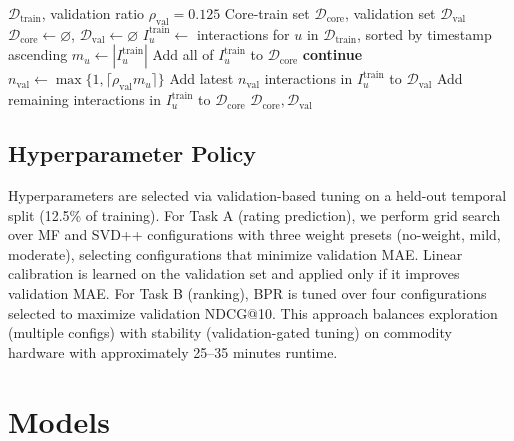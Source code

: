 \documentclass[sigconf,nonacm]{acmart}
\begin{document}
\begin{algorithm}[t]
\caption{Per-User Validation Split Within Train}
\label{alg:val-split}
\begin{algorithmic}[1]
\Require $\mathcal{D}_{\mathrm{train}}$, validation ratio $\rho_{\mathrm{val}} = 0.125$
\Ensure Core-train set $\mathcal{D}_{\mathrm{core}}$, validation set $\mathcal{D}_{\mathrm{val}}$
\State $\mathcal{D}_{\mathrm{core}} \gets \varnothing$, $\mathcal{D}_{\mathrm{val}} \gets \varnothing$
  \State $I^{\mathrm{train}}_u \gets$ interactions for $u$ in $\mathcal{D}_{\mathrm{train}}$, sorted by timestamp ascending
  \State $m_u \gets |I^{\mathrm{train}}_u|$
    \State Add all of $I^{\mathrm{train}}_u$ to $\mathcal{D}_{\mathrm{core}}$
    \State \textbf{continue}
  \EndIf
  \State $n_{\mathrm{val}} \gets \max\{1, \lceil \rho_{\mathrm{val}} m_u \rceil\}$
  \State Add latest $n_{\mathrm{val}}$ interactions in $I^{\mathrm{train}}_u$ to $\mathcal{D}_{\mathrm{val}}$
  \State Add remaining interactions in $I^{\mathrm{train}}_u$ to $\mathcal{D}_{\mathrm{core}}$
\EndFor
\State \Return $\mathcal{D}_{\mathrm{core}}, \mathcal{D}_{\mathrm{val}}$
\end{algorithmic}
\end{algorithm}

\subsection{Hyperparameter Policy}
Hyperparameters are selected via validation-based tuning on a held-out temporal split (12.5\% of training). For Task A (rating prediction), we perform grid search over MF and SVD++ configurations with three weight presets (no-weight, mild, moderate), selecting configurations that minimize validation MAE. Linear calibration is learned on the validation set and applied only if it improves validation MAE. For Task B (ranking), BPR is tuned over four configurations selected to maximize validation NDCG@10. This approach balances exploration (multiple configs) with stability (validation-gated tuning) on commodity hardware with approximately 25--35 minutes runtime.

\section{Models}
\end{document}
